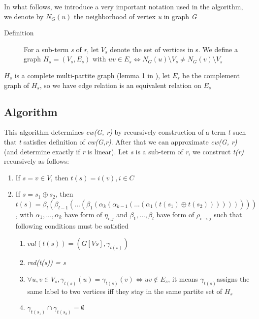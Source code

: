 \documentclass[a4paper, 12pt]{article}
\begin{document}
In what follows, we introduce a very important notation used in the algorithm, we denote by \textit {$N_{G}(u)$} the neighborhood of vertex \textit {u} in graph \textit {G} 

\begin{description}
\item [{Definition}] \cite {vadim-lozin} For a sub-term \textit {s} of \textit {r}, let \textit {$V_{s}$} denote the set of vertices in s. We define a graph \textit {$H_{s}=(V_{s}, E_{s})$} with $uv\in E_{s}\Longleftrightarrow N_{G}(u)\setminus V_{s}\neq N_{G}(v)\setminus V_{s}$
\end{description}

\textit{$H_{s}$} is a complete multi-partite graph (lemma 1 in \cite{vadim-lozin}), let \textit{$E_{s}$} be the complement graph of \textit{$H_{s}$}, so we have edge relation is an equivalent relation on \textit{$E_{s}$}

\subsection{Algorithm}

This algorithm determines \textit {cw(G, r)} by recursively construction of a term \textit {t} such that \textit {t} satisfies definition of \textit {cw(G,r)}. After that we can approximate \textit {cw(G, r)} (and determine exactly if  \textit {r} is linear). Let \textit {s} is a sub-term of \textit {r}, we construct \textit {t(r)} recursively as follows:

\begin{enumerate}
\item If $s=v\in V$, then $t(s)=i(v),i\in C$ 
\item If $s=s_{1}\oplus s_{2}$, then $t(s)=\beta_{l}(\beta_{l-1}(...(\beta_{1}(\alpha_{k}(\alpha_{k-1}(...(\alpha_{1}(t(s_{1})\oplus t(s_{2})))))))))$, with \textit {$\alpha_{1},...,\alpha_{k}$} have form of $\eta_{i,j}$ and \textit {$\beta_{1},...,\beta_{l}$} have form of $\rho_{i\rightarrow j}$ such that following conditions must be satisfied

\begin{enumerate}
\item \textit {$val(t(s))=(G[Vs],\gamma_{t(s)})$} 
\item \textit {red(t(s)) = s} 
\item $\forall u,v\in V_{s},\gamma_{t(s)}(u)=\gamma_{t(s)}(v)\Leftrightarrow uv\notin E_{s}$,
it means \textit {$\gamma_{t(s)}$}assigns the same label to two vertices iff they stay in the same partite set of \textit {$H_{s}$} 
\item \textit {$\gamma_{t(s_{1})}\cap\gamma_{t(s_{2})}=\emptyset$} \end{enumerate}
\end{enumerate}
\end{document}

